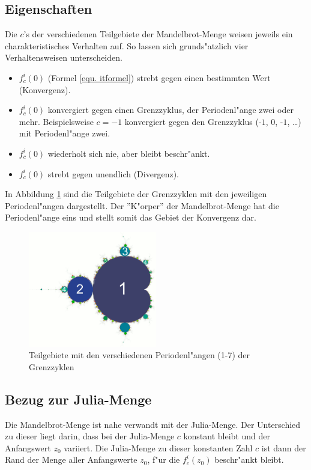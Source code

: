 \begin{refsection}
\subsection{Eigenschaften}
Die $c$'s der verschiedenen Teilgebiete der Mandelbrot-Menge
weisen jeweils ein charakteristisches Verhalten auf. So lassen sich
grunds"atzlich vier Verhaltensweisen unterscheiden.
\begin{itemize}
\item $f_c^i(0)$ (Formel \ref{equ. itformel}) strebt gegen einen
bestimmten Wert (Konvergenz).
\item $f_c^i(0)$ konvergiert gegen einen Grenzzyklus, der Periodenl"ange
zwei oder mehr. Beispielsweise $c=-1$ konvergiert gegen den Grenzzyklus
(-$1$, $0$, -$1$, \dots) mit Periodenl"ange zwei.
\item $f_c^i(0)$ wiederholt sich nie, aber bleibt beschr"ankt.
\item $f_c^i(0)$ strebt gegen unendlich (Divergenz).
\end{itemize}
In Abbildung \ref{fig. grenzzyklen} sind die Teilgebiete der Grenzzyklen
mit den jeweiligen Periodenl"angen dargestellt. Der ''K"orper'' der
Mandelbrot-Menge hat die Periodenl"ange eins und stellt somit das Gebiet
der Konvergenz dar. \cite{wiki} \\[-0.8cm]
\begin{figure}[ht!]\centering
	\includegraphics[width=0.5\textwidth]{apfel/pic/perioden_mandelbrotmenge.png}
	\caption{Teilgebiete mit den verschiedenen Periodenl"angen (1-7) der Grenzzyklen \cite{wikiBild}}
	\label{fig. grenzzyklen}
\end{figure}

\subsection{Bezug zur Julia-Menge}
Die Mandelbrot-Menge ist nahe verwandt mit der Julia-Menge. Der
Unterschied zu dieser liegt darin, dass bei der Julia-Menge $c$ konstant
bleibt und der Anfangswert $z_0$ variiert. Die Julia-Menge zu dieser
konstanten Zahl $c$ ist dann der Rand der Menge aller Anfangswerte $z_0$,
f"ur die $f_c^i(z_0)$ beschr"ankt bleibt.


\end{refsection}
